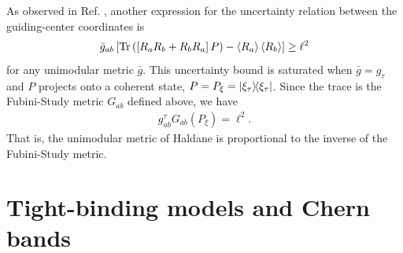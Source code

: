 \documentclass[aps,prb,twocolumn,letterpaper,twoside,nobalancelastpage,groupedaddress,amsmath,amssymb,floatfix,citeautoscript]{revtex4-1}
\begin{document}
As observed in Ref. \cite{haldane_geometry_2015}, another expression for the uncertainty relation between the guiding-center coordinates is
\begin{align*}
\bar{g}_{ab}\left[\text{Tr}\left(\left[R_aR_b + R_bR_a\right] P\right) - \expval{R_a}\expval{R_b}\right] \geq \ell^2
\end{align*}
for any unimodular metric $\bar{g}$. This uncertainty bound is saturated when $\bar{g} = g_{\tau}$ and $P$ projects onto a coherent state, $P = P_{\xi} = \dyad{\xi_{\tau}}$. Since the trace is the Fubini-Study metric $G_{ab}$ defined above, we have
\begin{align*}
g^{\tau}_{ab}G_{ab}(P_{\xi}) = \ell^2.
\end{align*}
That is, the unimodular metric of Haldane is proportional to the inverse of the Fubini-Study metric.








\section{Tight-binding models and Chern bands}
\end{document}
